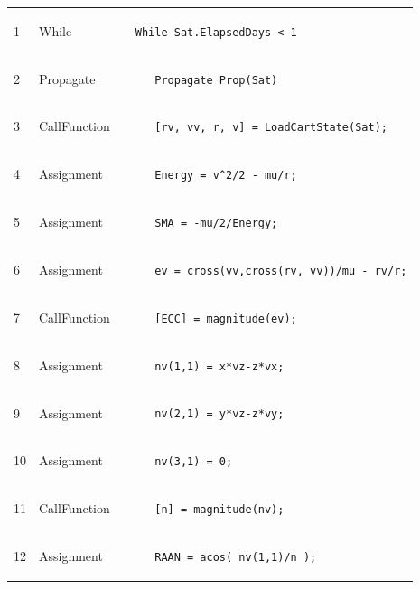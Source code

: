 \begin{center}
\tablefirsthead{}
\tablehead{}
\tabletail{}
\tablelasttail{}
\begin{supertabular}{lllp{4in}}
\begin{footnotesize}1\end{footnotesize} & While & & \texttt{While Sat.ElapsedDays < 1}\\
\begin{footnotesize}2\end{footnotesize} & Propagate & & \texttt{\ \ \ Propagate Prop(Sat)}\\
\begin{footnotesize}3\end{footnotesize} & CallFunction & & \texttt{\ \ \ [rv, vv, r, v] =
LoadCartState(Sat);}\\
\begin{footnotesize}4\end{footnotesize} & Assignment & & \texttt{\ \ \ Energy = v\^{}2/2 - mu/r;}\\
\begin{footnotesize}5\end{footnotesize} & Assignment & & \texttt{\ \ \ SMA = -mu/2/Energy;}\\
\begin{footnotesize}6\end{footnotesize} & Assignment & & \texttt{\ \ \ ev = cross(vv,cross(rv,
vv))/mu - rv/r;}\\
\begin{footnotesize}7\end{footnotesize} & CallFunction & & \texttt{\ \ \ [ECC] = magnitude(ev);}\\
\begin{footnotesize}8\end{footnotesize} & Assignment & & \texttt{\ \ \ nv(1,1)  =  x*vz-z*vx;}\\
\begin{footnotesize}9\end{footnotesize} & Assignment & & \texttt{\ \ \ nv(2,1)  =  y*vz-z*vy;}\\
\begin{footnotesize}10\end{footnotesize} & Assignment & & \texttt{\ \ \ nv(3,1)  =  0;}\\
\begin{footnotesize}11\end{footnotesize} & CallFunction & & \texttt{\ \ \ [n] = magnitude(nv);}\\
\begin{footnotesize}12\end{footnotesize} & Assignment & & \texttt{\ \ \ RAAN = acos( nv(1,1)/n );}\\

\end{supertabular}
\end{center}
